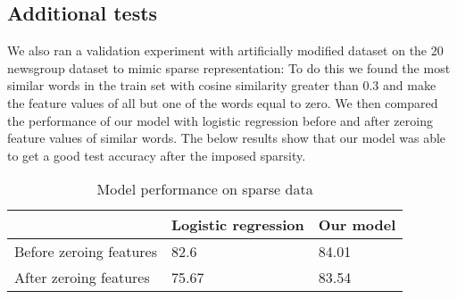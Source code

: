 \newpage
\subsection{Additional tests}

We also ran a validation experiment with artificially modified dataset on the 20 newsgroup dataset to mimic sparse representation: To do this we found the most similar words in the train set with cosine similarity greater than 0.3 and make the feature values of all but one of the words equal to zero. We then compared the performance of our model with logistic regression before and after zeroing feature values of similar words. The below results show that our model was able to get a good test accuracy after the imposed sparsity.\\


\begin{table}[htbp]
\centering
\begin{tabular}{l|l|l}
 & \multicolumn{1}{c|}{Logistic regression} & \multicolumn{1}{c}{Our model} \\ \hline
Before zeroing features & 82.6 & 84.01 \\
After zeroing features & 75.67 & 83.54
\end{tabular}
\caption{\label{tab:widgets}Model performance on sparse data}
\end{table}
